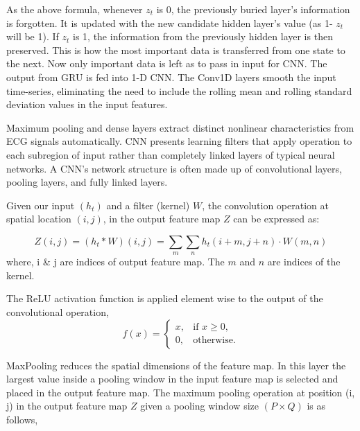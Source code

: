 As the above formula,  whenever $z_t$ is 0,  the previously buried layer's information is forgotten. It is updated with the new candidate hidden layer's value (as 1- $z_t$ will be 1). If $z_t$ is 1,  the information from the previously hidden layer is then preserved. This is how the most important data is transferred from one state to the next. Now only important data is left as to pass in input for CNN. The output from GRU is fed into 1-D CNN. The Conv1D layers smooth the input time-series,  eliminating the need to include the rolling mean and rolling standard deviation values in the input features.





Maximum pooling and dense layers extract distinct nonlinear characteristics from ECG signals automatically. CNN presents learning filters that apply operation to each subregion of input rather than completely linked layers of typical neural networks. A CNN's network structure is often made up of convolutional layers,  pooling layers,  and fully linked layers.






Given our input $(h_t)$ and a filter (kernel) \(W\),  the convolution operation at spatial location $(i, j)$,  in the output feature map  \(Z\) can be expressed as:

   \begin{equation}
   Z(i,  j) = ( h_t \ast W)(i,  j) = \sum_{m}\sum_{n} h_t(i+m,  j+n) \cdot W(m,  n)
   \end{equation}
where,  i \& j are indices of output feature map. The $m$ and $n$ are indices of the kernel.


The ReLU activation function is applied element wise to the output of the convolutional operation, \\ 

\begin{equation}
    f(x)=  \begin {cases}  x,  & \text{if } x \geq 0,  \\
    0,  & \text{otherwise}. \end{cases}
\end{equation}
  

MaxPooling reduces the spatial dimensions of the feature map. In this layer the largest value inside a pooling window in the input feature map is selected and placed in the output feature map. The maximum pooling operation at position (i, j) in the output feature map \(Z\) given a pooling window size $(P \times Q)$ is as follows, 

